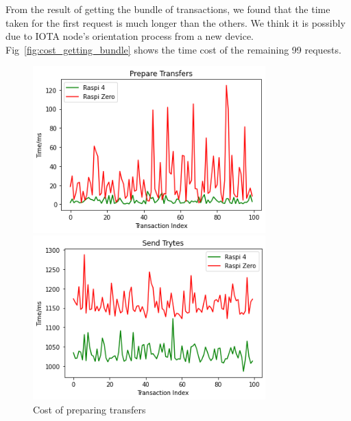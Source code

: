 From the result of getting the bundle of transactions, we found that the time taken for the first request is much longer than the others. We think it is possibly due to IOTA node's orientation process from a new device.
Fig~\ref{fig:cost_getting_bundle} shows the time cost of the remaining 99 requests.



\begin{figure}[t]
    \centering

\begin{minipage}[t]{0.45\linewidth}
    \centering
    \includegraphics[width=0.8\textwidth]{figs/prepare_transfers_0.png}
    \caption{Cost of preparing transfers}
    \label{fig:cost_preparing_transfers}
\end{minipage}
		\hfill
\begin{minipage}[t]{0.45\linewidth}
    \centering
    \includegraphics[width=0.8\textwidth]{figs/send_trytes_0.png}

\end{minipage}
\end{figure}
